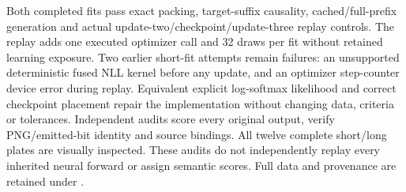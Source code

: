 Both completed fits pass exact packing, target-suffix causality,
cached/full-prefix generation and actual update-two/checkpoint/update-three
replay controls. The replay adds one executed optimizer call and 32 draws
per fit without retained learning exposure. Two earlier short-fit attempts
remain failures: an unsupported deterministic fused NLL kernel before any
update, and an optimizer step-counter device error during replay. Equivalent
explicit log-softmax likelihood and correct checkpoint placement repair the
implementation without changing data, criteria or tolerances. Independent
audits score every original output, verify PNG/emitted-bit identity and source
bindings. All twelve complete short/long plates are visually inspected.
These audits do not independently replay every inherited neural forward or
assign semantic scores. Full data and provenance are retained under
.

\clearpage
{}
